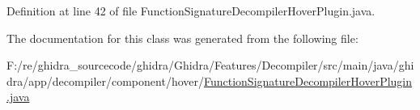 Definition at line 42 of file Function\+Signature\+Decompiler\+Hover\+Plugin.\+java.



The documentation for this class was generated from the following file\+:\begin{DoxyCompactItemize}
\item 
F\+:/re/ghidra\+\_\+sourcecode/ghidra/\+Ghidra/\+Features/\+Decompiler/src/main/java/ghidra/app/decompiler/component/hover/\mbox{\hyperlink{_function_signature_decompiler_hover_plugin_8java}{Function\+Signature\+Decompiler\+Hover\+Plugin.\+java}}\end{DoxyCompactItemize}
